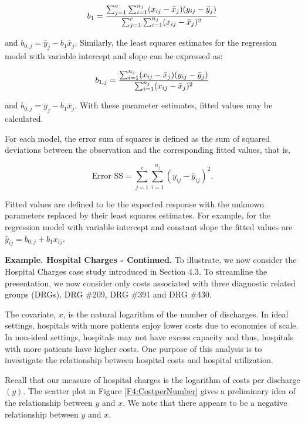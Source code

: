 \begin{equation*}
b_1=\frac{\sum_{j=1}^{c}\sum_{i=1}^{n_{j}}(x_{ij}-\bar{x}_{j})(y_{ij}-\bar{%
y}_{j})}{\sum_{j=1}^{c}\sum_{i=1}^{n_{j}}(x_{ij}-\bar{x}_{j})^{2}}
\end{equation*}

\noindent and $b_{0,j}=\bar{y}_{j}-b_1\bar{x}_{j}$. Similarly, the
least squares estimates for the regression model with variable
intercept and slope can be expressed as:

\begin{equation*}
b_{1,j}=\frac{\sum_{i=1}^{n_{j}}(x_{ij}-\bar{x}_{j})(y_{ij}-\bar{y}_{j})}{%
\sum_{i=1}^{n_{j}}(x_{ij}-\bar{x}_{j})^{2}}
\end{equation*}

\noindent and $b_{0,j}=\bar{y}_{j}-b_1\bar{x}_{j}$. With these
parameter estimates, fitted values may be calculated.

For each model, the error sum of squares is defined as the sum of
squared deviations between the observation and the corresponding
fitted values, that is,

\begin{equation*}
\text{Error
SS}=\sum_{j=1}^{c}\sum_{i=1}^{n_{j}}(y_{ij}-\hat{y}_{ij})^{2}.
\end{equation*}

\noindent Fitted values are defined to be the expected response with
the unknown parameters replaced by their least squares estimates.
For example, for the regression model with variable intercept and
constant slope the fitted values are
$\hat{y}_{ij}=b_{0,j}+b_1x_{ij}$.

\linejed

\textbf{Example. Hospital Charges - Continued.} To illustrate, we
now consider the Hospital Charges case study introduced in Section
4.3. To streamline the presentation, we now consider only costs
associated with three diagnostic related groups (DRGs), DRG \#209,
DRG \#391 and DRG \#430.

The covariate, $x$, is the natural logarithm of the number of
discharges. In ideal settings, hospitals with more patients enjoy
lower costs due to economies of scale. In non-ideal settings,
hospitals may not have excess capacity and thus, hospitals with more
patients have higher costs. One purpose of this analysis is to
investigate the relationship between hospital costs and hospital
utilization.

Recall that our measure of hospital charges is the logarithm of
costs per discharge $(y)$. The scatter plot in Figure
\ref{F4:CostperNumber} gives a preliminary idea of the relationship
between $y$ and $x$. We note that there appears to be a negative
relationship between $y$ and $x$.

